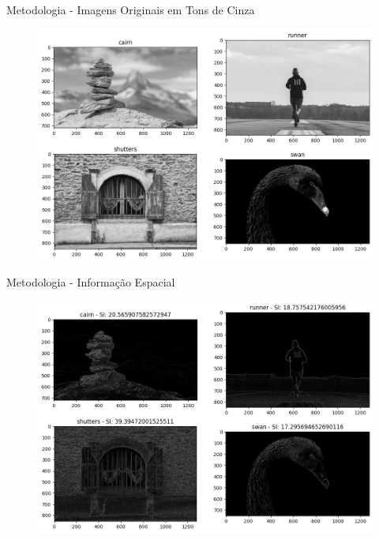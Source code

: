 \documentclass[]{beamer}
\begin{document}
\begin{frame}{Metodologia - Imagens Originais em Tons de Cinza}
    \begin{figure}
        \includegraphics[scale=0.4]{Imagens/imagens-originais-gray.png}
    \end{figure}  
\end{frame}

\begin{frame}{Metodologia - Informação Espacial}
    \begin{figure}
        \includegraphics[scale=0.4]{Imagens/metodologia-si.png}
    \end{figure}  
\end{frame}
\end{document}
